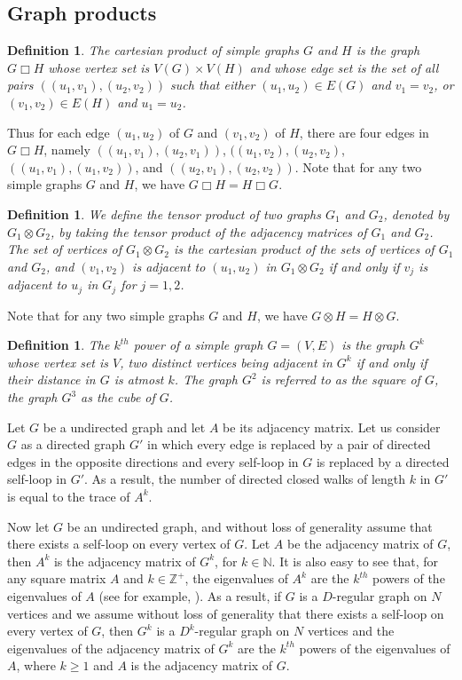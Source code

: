 \documentclass{article}
\newtheorem{definition}[theorem]{Definition}
\newcommand{\Z}{\mathbb{Z}}
\newcommand{\N}{\mathbb{N}}
\begin{document}
\subsection{Graph products}
\begin{definition}\label{cartesianproduct}{\rm \cite[pp. 30]{BM2008}}
The cartesian product of simple graphs $G$ and $H$ is the graph $G\Box H$ whose vertex set is $V(G)\times V(H)$ and whose edge set is the set of all pairs $((u_1,v_1),(u_2,v_2))$ such that either $(u_1,u_2)\in E(G)$ and $v_1=v_2$, or $(v_1,v_2)\in E(H)$ and $u_1=u_2$.
\end{definition}
Thus for each edge $(u_1,u_2)$ of $G$ and $(v_1,v_2)$ of $H$, there are four edges in $G\Box H$, namely $((u_1,v_1),(u_2,v_1))$, $((u_1,v_2),(u_2,v_2)$, $((u_1,v_1),(u_1,v_2))$, and $((u_2,v_1),(u_2,v_2))$. Note that for any two simple graphs $G$ and $H$, we have $G\Box H=H\Box G$.

\begin{definition}\label{tensorproduct}{\rm \cite[Section 2.3, pp.168]{RVW2002}}
We define the tensor product of two graphs $G_1$ and $G_2$, denoted by $G_1\otimes G_2$, by taking the tensor product of the adjacency matrices of $G_1$ and $G_2$. The set of vertices of $G_1\otimes G_2$ is the cartesian product of the sets of vertices of $G_1$ and $G_2$, and $(v_1,v_2)$ is adjacent to $(u_1,u_2)$ in $G_1\otimes G_2$ if and only if $v_j$ is adjacent to $u_j$ in $G_j$ for $j=1,2$.
\end{definition}
Note that for any two simple graphs $G$ and $H$, we have $G\otimes H=H\otimes G$.
\begin{definition}\label{powering}{\rm \cite[pp. 82]{BM2008}}
The $k^{th}$ power of a simple graph $G=(V,E)$ is the graph $G^k$ whose vertex set is $V$, two distinct vertices being adjacent in $G^k$ if and only if their distance in $G$ is atmost $k$. The graph $G^2$ is referred to as the square of $G$, the graph $G^3$ as the cube of $G$.
\end{definition}
Let $G$ be a undirected graph and let $A$ be its adjacency matrix. Let us consider $G$ as a directed graph $G'$ in which every edge is replaced by a pair of directed edges in the opposite directions and every self-loop in $G$ is replaced by a directed self-loop in $G'$. As a result, the number of directed closed walks of length $k$ in $G'$ is equal to the trace of $A^k$.

Now let $G$ be an undirected graph, and without loss of generality assume that there exists a self-loop on every vertex of $G$. Let $A$ be the adjacency matrix of $G$, then $A^k$ is the adjacency matrix of $G^k$, for $k\in\N$. It is also easy to see that, for any square matrix $A$ and $k\in\Z^+$, the eigenvalues of $A^k$ are the $k^{th}$ powers of the eigenvalues of $A$ (see for example, \cite[Section 5.2]{Str2006}). As a result, if $G$ is a $D$-regular graph on $N$ vertices and we assume without loss of generality that there exists a self-loop on every vertex of $G$, then $G^k$ is a $D^k$-regular graph on $N$ vertices and the eigenvalues of the adjacency matrix of $G^k$ are the $k^{th}$ powers of the eigenvalues of $A$, where $k\geq 1$ and $A$ is the adjacency matrix of $G$.
\end{document}
